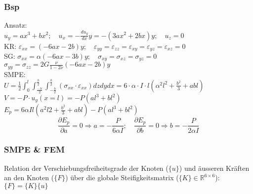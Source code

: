         \subsubsection{Bsp}
            Ansatz:\\
            $u_y=ax^3+bx^2; \quad u_x=-\frac{du_y}{dx}y= -(3ax^2+2bx)y; \quad u_z = 0$\\
            KR: $\varepsilon_{xx} =(-6ax-2b)y; \quad \varepsilon_{yy}=\varepsilon_{zz}=\varepsilon_{xy}=\varepsilon_{yz} = \varepsilon_{xz}=0$\\
            SG: $\sigma_{xx} = \alpha(-6ax-3b)y; \quad \sigma_{xy}=\sigma_{xz}=\sigma_{yz}=0$\\ $\sigma_{yy}=\sigma_{zz}=2G\frac{\nu}{1-2\nu}(-6ax-2b)y$\\
            SMPE:\\
            $U=\frac{1}{2}\int_0^l\int_\frac{-h}{2}^\frac{h}{2}\int_{-\frac{b}{2}}^\frac{b}{2}(\sigma_{xx}\cdot\varepsilon_{xx})dzdydx=6\cdot\alpha\cdot I\cdot l(\alpha^2l^2+\frac{b^2}{3}+abl)$\\
            $V=-P\cdot u_y(x=l)=-P(al^3+bl^2)$\\
            $E_p=6\alpha Il(a^2l2+\frac{b^2}{3}+abl)-P(al^3+bl^2)$
            \small\[\frac{\partial E_p}{\partial a} = 0 \Rightarrow a=-\frac{P}{6\alpha I};\quad\frac{\partial E_p}{\partial b} = 0 \Rightarrow b=-\frac{P}{2\alpha I}\]\normalsize
            
        \subsubsection{SMPE \& FEM}
            Relation der Verschiebungsfreiheitsgrade der Knoten ($\{u\}$) und äusseren Kräften an den Knoten ($\{F\}$) über die globale Steifigkeitsmatrix ($\{K\}\in\mathbb{R}^{6\times6}$): $\{F\}=\{K\}\{u\}$

